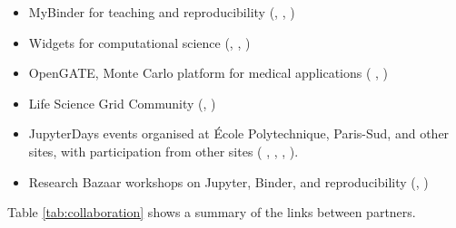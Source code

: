 \begin{enumerate}
\begin{itemize}
  \item MyBinder for teaching and reproducibility (, , )
  \item Widgets for computational science (, , )
  \item OpenGATE, Monte Carlo platform for medical applications (
    , )
  \item Life Science Grid Community (, )
  \item JupyterDays events organised at \'Ecole Polytechnique, Paris-Sud,
  and other sites, with participation from other sites (
  , , , ).
  \item Research Bazaar workshops on Jupyter, Binder, and reproducibility
    (, )
 \end{itemize}
\end{enumerate}

Table \ref{tab:collaboration} shows a summary of the links
between partners.


